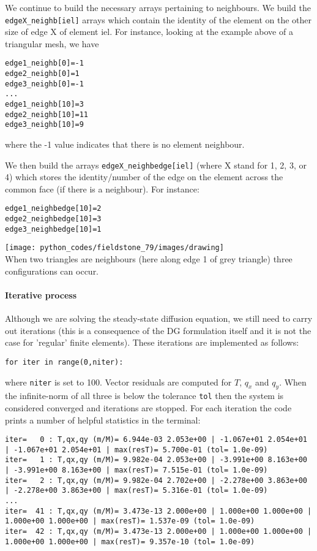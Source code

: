We continue to build the necessary arrays pertaining to neighbours. 
We build the {\tt edgeX\_neighb[iel]} arrays which contain the identity of the element 
on the other size of edge X of element iel.
For instance, looking at the example above of a triangular mesh, we have
\begin{lstlisting}
edge1_neighb[0]=-1
edge2_neighb[0]=1
edge3_neighb[0]=-1
...
edge1_neighb[10]=3
edge2_neighb[10]=11
edge3_neighb[10]=9
\end{lstlisting}
where the -1 value indicates that there is no element neighbour.

We then build the arrays {\tt edgeX\_neighbedge[iel]} (where X stand for 1, 2, 3, 
or 4) which stores the identity/number of the edge on the element across the common face
(if there is a neighbour).
For instance:
\begin{lstlisting}
edge1_neighbedge[10]=2
edge2_neighbedge[10]=3
edge3_neighbedge[10]=1
\end{lstlisting}


\begin{center}
\texttt{[image: python\_codes/fieldstone\_79/images/drawing]}\\
{\captionfont When two triangles are neighbours (here along edge 1
of grey triangle) three configurations can occur.}
\end{center}

\paragraph{Iterative process}
Although we are solving the steady-state diffusion equation, we still need to carry out 
iterations (this is a consequence of the DG formulation itself and it is not the 
case for 'regular' finite elements).
These iterations are implemented as follows:
\begin{lstlisting}
for iter in range(0,niter):
\end{lstlisting}
where {\tt niter} is set to 100. Vector residuals are computed for $T$, $q_x$ and $q_y$. When the
infinite-norm of all three is below the tolerance {\tt tol} then the system is considered 
converged and iterations are stopped.   
For each iteration the code prints a number of helpful statistics in the terminal:
\begin{scriptsize}
\begin{verbatim}
iter=   0 : T,qx,qy (m/M)= 6.944e-03 2.053e+00 | -1.067e+01 2.054e+01 | -1.067e+01 2.054e+01 | max(resT)= 5.700e-01 (tol= 1.0e-09)
iter=   1 : T,qx,qy (m/M)= 9.982e-04 2.053e+00 | -3.991e+00 8.163e+00 | -3.991e+00 8.163e+00 | max(resT)= 7.515e-01 (tol= 1.0e-09)
iter=   2 : T,qx,qy (m/M)= 9.982e-04 2.702e+00 | -2.278e+00 3.863e+00 | -2.278e+00 3.863e+00 | max(resT)= 5.316e-01 (tol= 1.0e-09)
...
iter=  41 : T,qx,qy (m/M)= 3.473e-13 2.000e+00 | 1.000e+00 1.000e+00 | 1.000e+00 1.000e+00 | max(resT)= 1.537e-09 (tol= 1.0e-09)
iter=  42 : T,qx,qy (m/M)= 3.473e-13 2.000e+00 | 1.000e+00 1.000e+00 | 1.000e+00 1.000e+00 | max(resT)= 9.357e-10 (tol= 1.0e-09)
\end{verbatim}
\end{scriptsize}

